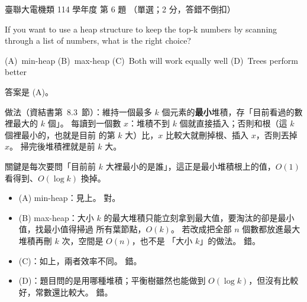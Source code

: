 \begin{pastexam}[label={px:ust-114-ee-ds-06}]{臺聯大電機類 114 學年度 第 6 題}
（單選；2 分，答錯不倒扣）

If you want to use a heap structure to keep the top-k numbers by scanning through a list of numbers,
what is the right choice?

(A)~min-heap \qquad (B)~max-heap \qquad (C)~Both will work equally well \qquad (D)~Trees perform
better
\end{pastexam}

\begin{pastsoln}
答案是 (A)。

做法（資結書第~8.3~節）：維持一個最多 $k$ 個元素的\textbf{最小}堆積，存「目前看過的數裡最大的
$k$ 個」。 每讀到一個數 $x$：堆積不到 $k$ 個就直接插入；否則和根（這 $k$ 個裡最小的，也就是目前
的第 $k$ 大）比，$x$ 比較大就刪掉根、插入 $x$，否則丟掉 $x$。 掃完後堆積裡就是前 $k$ 大。

關鍵是每次要問「目前前 $k$ 大裡最小的是誰」，這正是最小堆積根上的值，$O(1)$ 看得到、$O(\log k)$
換掉。
\begin{itemize}
\item (A) min-heap：見上。 對。
\item (B) max-heap：大小 $k$ 的最大堆積只能立刻拿到最大值，要淘汰的卻是最小值，找最小值得掃過
所有葉節點，$O(k)$。 若改成把全部 $n$ 個數都放進最大堆積再刪 $k$ 次，空間是 $O(n)$，也不是
「大小 $k$」的做法。 錯。
\item (C)：如上，兩者效率不同。 錯。
\item (D)：題目問的是用哪種堆積；平衡樹雖然也能做到 $O(\log k)$，但沒有比較好，常數還比較大。 錯。
\end{itemize}
\end{pastsoln}
